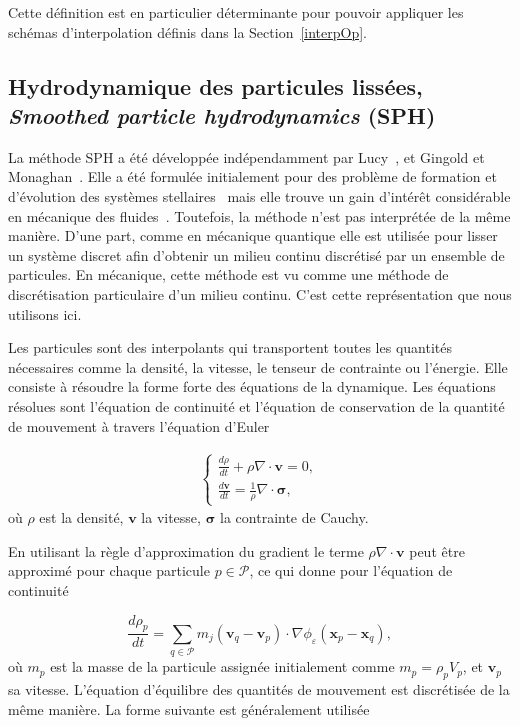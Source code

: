 Cette définition est en particulier déterminante pour pouvoir appliquer les schémas d'interpolation définis dans la Section~\ref{interpOp}.

\subsection{Hydrodynamique des particules lissées, \textit{Smoothed particle hydrodynamics} (SPH)}

La méthode SPH a été développée indépendamment par Lucy~\cite{lucy_1977}, et Gingold et Monaghan~\cite{gingold_monaghan_sph_1977}. Elle a été formulée initialement pour des problème de formation et d'évolution des systèmes stellaires~\cite{hultman1999hierarchical} mais elle trouve un gain d'intérêt considérable en mécanique des fluides~\cite{PhysRevE.52.4899, SHADLOO201611}. Toutefois, la méthode n'est pas interprétée de la même manière. D'une part, comme en mécanique quantique elle est utilisée pour lisser un système discret afin d'obtenir un milieu continu discrétisé par un ensemble de particules. En mécanique, cette méthode est vu comme une méthode de discrétisation particulaire d'un milieu continu. C'est cette représentation que nous utilisons ici.

Les particules sont des interpolants qui transportent toutes les quantités nécessaires comme la densité, la vitesse, le tenseur de contrainte ou l'énergie. Elle consiste à résoudre la forme forte des équations de la dynamique. Les équations résolues sont l'équation de continuité et l'équation de conservation de la quantité de mouvement à travers l'équation d'Euler

\begin{gather*}
    \left\{\begin{aligned}
        \frac{d\rho}{dt} + \rho \nabla \cdot \bm{v} = 0, \\
        \frac{d\bm v}{dt} = \frac1\rho \nabla \cdot \bm \sigma,
    \end{aligned} \right.
\end{gather*}où $\rho$ est la densité, $\bm v$ la vitesse, $\bm \sigma$ la contrainte de Cauchy.

En utilisant la règle d'approximation du gradient le terme $\rho \nabla \cdot \bm{v}$ peut être approximé pour chaque particule $p \in \mathcal P$, ce qui donne pour l'équation de continuité

\begin{equation*}
    \frac{d\rho_p}{dt} = \sum_{q \in \mathcal P} m_j (\bm v_q - \bm v_p) \cdot \nabla \phi_\varepsilon(\bm x_p - \bm x_q),
\end{equation*}où $m_p$ est la masse de la particule assignée initialement comme $m_p = \rho_p V_p$, et $\bm v_p$ sa vitesse. L'équation d'équilibre des quantités de mouvement est discrétisée de la même manière. La forme suivante est généralement utilisée

